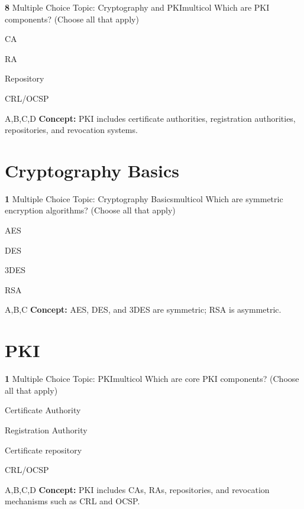 \documentclass[10pt,a4paper]{article}
\begin{document}
\begin{qcard}{\color{white}\textbf{8} \hfill \small Multiple Choice \textbar{} Topic: Cryptography and PKI}{multicol}
Which are PKI components? (Choose all that apply)

\begin{qoptions}
\item CA
\item RA
\item Repository
\item CRL/OCSP
\end{qoptions}
\begin{explainbox}{A,B,C,D}
\textbf{Concept:} PKI includes certificate authorities, registration authorities, repositories, and revocation systems.
\end{explainbox}
\end{qcard}

\section{Cryptography Basics}
\begin{qcard}{\color{white}\textbf{1} \hfill \small Multiple Choice \textbar{} Topic: Cryptography Basics}{multicol}
Which are symmetric encryption algorithms? (Choose all that apply)

\begin{qoptions}
\item AES
\item DES
\item 3DES
\item RSA
\end{qoptions}
\begin{explainbox}{A,B,C}
\textbf{Concept:} AES, DES, and 3DES are symmetric; RSA is asymmetric.
\end{explainbox}
\end{qcard}

\section{PKI}
\begin{qcard}{\color{white}\textbf{1} \hfill \small Multiple Choice \textbar{} Topic: PKI}{multicol}
Which are core PKI components? (Choose all that apply)

\begin{qoptions}
\item Certificate Authority
\item Registration Authority
\item Certificate repository
\item CRL/OCSP
\end{qoptions}
\begin{explainbox}{A,B,C,D}
\textbf{Concept:} PKI includes CAs, RAs, repositories, and revocation mechanisms such as CRL and OCSP.
\end{explainbox}
\end{qcard}
\end{document}
